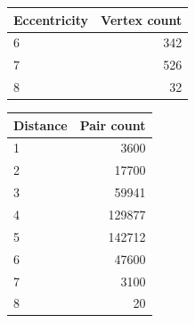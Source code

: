 \begin{center}
\begin{tabular}{lr}
\toprule
Eccentricity & Vertex count \\
\midrule
6 & 342 \\
7 & 526 \\
8 & 32 \\
\bottomrule
\end{tabular}
\end{center}

\begin{center}
\begin{tabular}{lr}
\toprule
Distance & Pair count \\
\midrule
1 & 3600 \\
2 & 17700 \\
3 & 59941 \\
4 & 129877 \\
5 & 142712 \\
6 & 47600 \\
7 & 3100 \\
8 & 20 \\
\bottomrule
\end{tabular}
\end{center}

